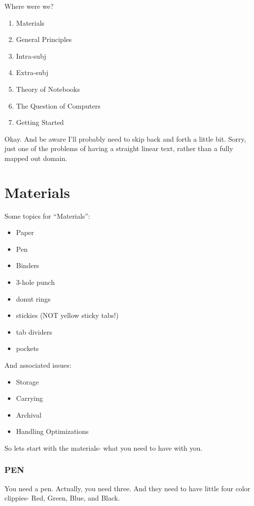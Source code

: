 \documentclass[oneside]{book}
\begin{document}
Where were we?

\begin{enumerate}
\item Materials
\item General Principles
\item Intra-subj
\item Extra-subj
\item Theory of Notebooks
\item The Question of Computers
\item Getting Started
\end{enumerate}

Okay. And be aware I'll probably need to skip back and forth a little
bit. Sorry, just one of the problems of having a straight linear text,
rather than a fully mapped out domain.

\mainmatter
\chapter{Materials}

Some topics for ``Materials'':

\begin{itemize}
\item Paper
\item Pen
\item Binders
\item 3-hole punch
\item donut rings
\item stickies (NOT yellow sticky tabs!)
\item tab dividers
\item pockets
\end{itemize}

And associated issues:

\begin{itemize}
\item Storage
\item Carrying
\item Archival
\item Handling Optimizations
\end{itemize}

So lets start with the materials- what you need to have with you.

\subsection*{PEN}

You need a pen. Actually, you need three. And they need to have little
four color clippies- Red, Green, Blue, and Black.
\end{document}
